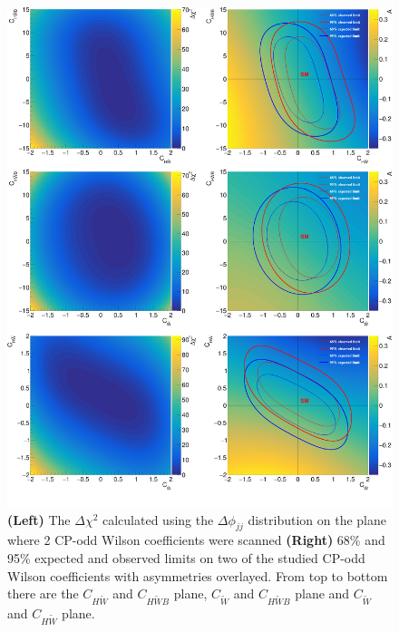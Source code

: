 \documentclass[a4paper,12pt]{article}
\begin{document}
		\begin{figure}[ht]
			\begin{centering}
			\includegraphics[scale=0.1122]{figures/limitCt.png}
			\caption{\textbf{(Left)} The $\Delta\chi^2$ calculated using the $\Delta\phi_{jj}$ distribution on the plane where 2 CP-odd Wilson coefficients were scanned 
					 \textbf{(Right)} 68\% and 95\% expected and observed limits on two of the studied CP-odd Wilson coefficients with asymmetries overlayed.
					 From top to bottom there are the $C_{H\tilde{W}}$ and $C_{H\tilde{W}B}$ plane,  $C_{\tilde{W}}$ and $C_{H\tilde{W}B}$ plane and $C_{\tilde{W}}$ and $C_{H\tilde{W}}$ plane.}
			\label{fig:LimitCt}
			\end{centering}
		\end{figure}
\end{document}
